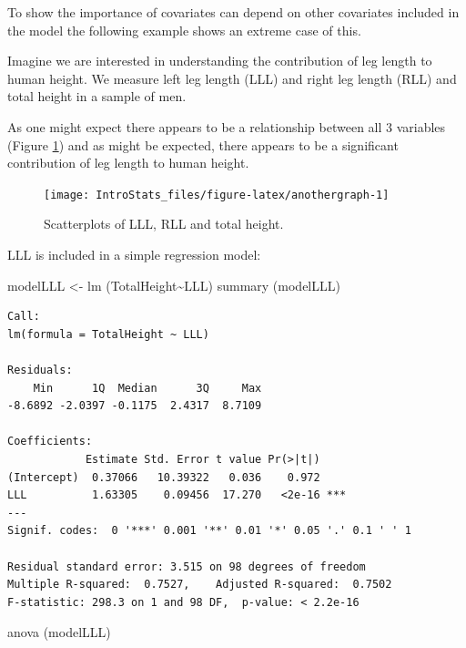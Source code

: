 \documentclass[
  oneside]{krantz}
\newenvironment{Shaded}{\begin{snugshade}}{\end{snugshade}}
\newcommand{\FunctionTok}[1]{\textcolor[rgb]{0.00,0.00,0.00}{#1}}
\newcommand{\NormalTok}[1]{#1}
\newcommand{\OtherTok}[1]{\textcolor[rgb]{0.56,0.35,0.01}{#1}}
\newcommand{\SpecialCharTok}[1]{\textcolor[rgb]{0.00,0.00,0.00}{#1}}
\begin{document}
To show the importance of covariates can depend on other covariates included in the model the following example shows an extreme case of this.

Imagine we are interested in understanding the contribution of leg length to human height. We measure left leg length (LLL) and right leg length (RLL) and total height in a sample of men.

As one might expect there appears to be a relationship between all 3 variables (Figure \ref{fig:anothergraph}) and as might be expected, there appears to be a significant contribution of leg length to human height.

\begin{figure}

{\centering \texttt{[image: IntroStats\_files/figure-latex/anothergraph-1]} 

}

\caption{Scatterplots of LLL, RLL and total height. }\label{fig:anothergraph}
\end{figure}

LLL is included in a simple regression model:

\begin{Shaded}
\begin{Highlighting}[]
\NormalTok{modelLLL }\OtherTok{\textless{}{-}} \FunctionTok{lm}\NormalTok{ (TotalHeight}\SpecialCharTok{\textasciitilde{}}\NormalTok{LLL)}
\FunctionTok{summary}\NormalTok{ (modelLLL)}
\end{Highlighting}
\end{Shaded}

\begin{verbatim}
Call:
lm(formula = TotalHeight ~ LLL)

Residuals:
    Min      1Q  Median      3Q     Max 
-8.6892 -2.0397 -0.1175  2.4317  8.7109 

Coefficients:
            Estimate Std. Error t value Pr(>|t|)    
(Intercept)  0.37066   10.39322   0.036    0.972    
LLL          1.63305    0.09456  17.270   <2e-16 ***
---
Signif. codes:  0 '***' 0.001 '**' 0.01 '*' 0.05 '.' 0.1 ' ' 1

Residual standard error: 3.515 on 98 degrees of freedom
Multiple R-squared:  0.7527,    Adjusted R-squared:  0.7502 
F-statistic: 298.3 on 1 and 98 DF,  p-value: < 2.2e-16
\end{verbatim}

\begin{Shaded}
\begin{Highlighting}[]
\FunctionTok{anova}\NormalTok{ (modelLLL)}
\end{Highlighting}
\end{Shaded}
\end{document}
